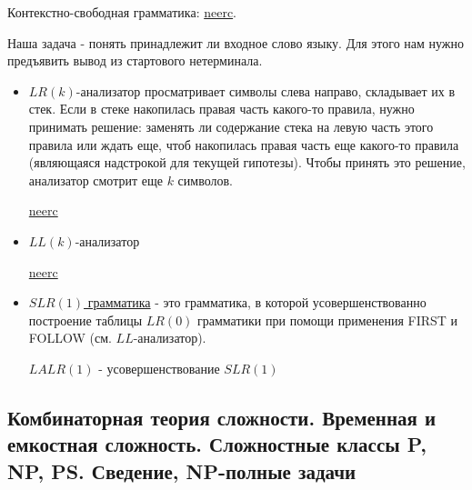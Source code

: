 \documentclass{article}
\begin{document}

Контекстно-свободная грамматика: \href{https://neerc.ifmo.ru/wiki/index.php?title=%D0%9A%D0%BE%D0%BD%D1%82%D0%B5%D0%BA%D1%81%D1%82%D0%BD%D0%BE-%D1%81%D0%B2%D0%BE%D0%B1%D0%BE%D0%B4%D0%BD%D1%8B%D0%B5_%D0%B3%D1%80%D0%B0%D0%BC%D0%BC%D0%B0%D1%82%D0%B8%D0%BA%D0%B8,_%D0%B2%D1%8B%D0%B2%D0%BE%D0%B4,_%D0%BB%D0%B5%D0%B2%D0%BE-_%D0%B8_%D0%BF%D1%80%D0%B0%D0%B2%D0%BE%D1%81%D1%82%D0%BE%D1%80%D0%BE%D0%BD%D0%BD%D0%B8%D0%B9_%D0%B2%D1%8B%D0%B2%D0%BE%D0%B4,_%D0%B4%D0%B5%D1%80%D0%B5%D0%B2%D0%BE_%D1%80%D0%B0%D0%B7%D0%B1%D0%BE%D1%80%D0%B0}{neerc}.

Наша задача - понять принадлежит ли входное слово языку. Для этого нам нужно предъявить вывод из стартового нетерминала. 
\begin{itemize}
	\item $LR(k)$-анализатор просматривает символы слева направо, складывает их в стек. Если в стеке накопилась правая часть какого-то правила, нужно принимать решение: заменять ли содержание стека на левую часть этого правила или ждать еще, чтоб накопилась правая часть еще какого-то правила (являющаяся надстрокой для текущей гипотезы). Чтобы принять это решение, анализатор смотрит еще $k$ символов.
	
	\href{https://neerc.ifmo.ru/wiki/index.php?title=LR(k)-%D0%B3%D1%80%D0%B0%D0%BC%D0%BC%D0%B0%D1%82%D0%B8%D0%BA%D0%B8}{neerc}
	
	\item $LL(k)$-анализатор
	
	\href{https://neerc.ifmo.ru/wiki/index.php?title=LL(k)-%D0%B3%D1%80%D0%B0%D0%BC%D0%BC%D0%B0%D1%82%D0%B8%D0%BA%D0%B8,_%D0%BC%D0%BD%D0%BE%D0%B6%D0%B5%D1%81%D1%82%D0%B2%D0%B0_FIRST_%D0%B8_FOLLOW}{neerc}
	
	\item \href{https://ru.wikipedia.org/wiki/SLR(1)}{$SLR(1)$ грамматика} - это грамматика, в которой усовершенствованно построение таблицы $LR(0)$ грамматики при помощи применения FIRST и FOLLOW (см. $LL$-анализатор).
	
	\href{https://ru.wikipedia.org/wiki/LALR(1)}{$LALR(1)$} - усовершенствование $SLR(1)$
\end{itemize}


\subsection{Комбинаторная теория сложности. Временная и емкостная сложность.
Сложностные классы P, NP, PS. Сведение, NP-полные задачи}
\end{document}
